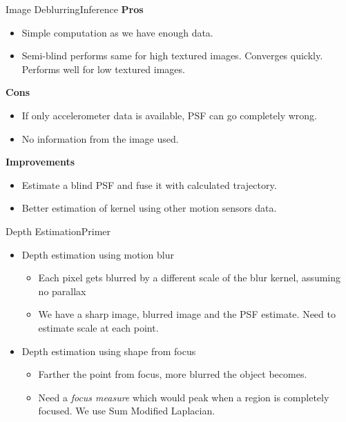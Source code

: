 \documentclass{beamer}
\begin{document}
\begin{frame}{Image Deblurring}{Inference}
\textbf{Pros}
\begin{itemize}
	\item Simple computation as we have enough data.
	\item Semi-blind performs same for high textured images. Converges
	quickly. Performs well for low textured images.
\end{itemize}
\textbf{Cons}
\begin{itemize}
	\item If only accelerometer data is available, PSF can go completely wrong.
	\item No information from the image used.
\end{itemize}
\textbf{Improvements}
\begin{itemize}
	\item Estimate a blind PSF and fuse it with calculated trajectory.
	\item Better estimation of kernel using other motion sensors data.
\end{itemize}
\end{frame}

\begin{frame}{Depth Estimation}{Primer}
\begin{itemize}
	\item Depth estimation using motion blur
	\begin{itemize}
		\item Each pixel gets blurred by a different scale of the blur kernel,
		assuming no parallax
		\item We have a sharp image, blurred image and the PSF estimate. Need to
		estimate scale at each point.
	\end{itemize}
	\vspace{0.4cm}
	\item Depth estimation using shape from focus
	\begin{itemize}
		\item Farther the point from focus, more blurred the object becomes.
		\item Need a \emph{focus measure} which would peak when a region is 
		completely focused. We use Sum Modified Laplacian.
	\end{itemize}
\end{itemize}
\end{frame}
\end{document}
